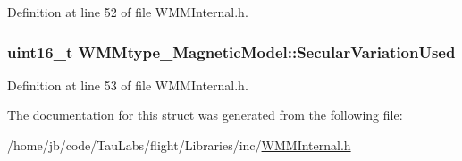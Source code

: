 \-Definition at line 52 of file \-W\-M\-M\-Internal.\-h.

\hypertarget{struct_w_m_mtype___magnetic_model_a75df8ef8af2f06cf375592712bb491d0}{
\subsubsection[{\-Secular\-Variation\-Used}]{\setlength{\rightskip}{0pt plus 5cm}uint16\-\_\-t {\bf \-W\-M\-Mtype\-\_\-\-Magnetic\-Model\-::\-Secular\-Variation\-Used}}}\label{struct_w_m_mtype___magnetic_model_a75df8ef8af2f06cf375592712bb491d0}


\-Definition at line 53 of file \-W\-M\-M\-Internal.\-h.



\-The documentation for this struct was generated from the following file\-:\begin{DoxyCompactItemize}
\item 
/home/jb/code/\-Tau\-Labs/flight/\-Libraries/inc/\hyperlink{_w_m_m_internal_8h}{\-W\-M\-M\-Internal.\-h}\end{DoxyCompactItemize}
